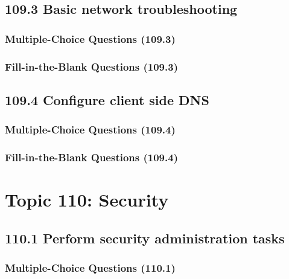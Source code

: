 \documentclass[a4paper]{report}
\begin{document}
\subsection*{109.3 Basic network troubleshooting}
\subsubsection*{Multiple-Choice Questions (109.3)}

\subsubsection*{Fill-in-the-Blank Questions (109.3)}

\subsection*{109.4 Configure client side DNS}
\subsubsection*{Multiple-Choice Questions (109.4)}

\subsubsection*{Fill-in-the-Blank Questions (109.4)}


\section*{Topic 110: Security}

\subsection*{110.1 Perform security administration tasks}
\subsubsection*{Multiple-Choice Questions (110.1)}
\end{document}
